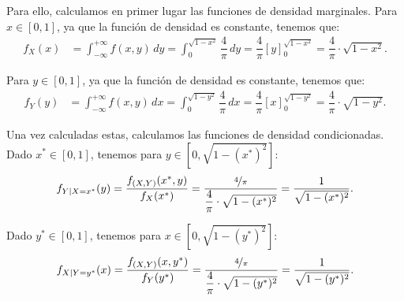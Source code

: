 \documentclass[12pt]{article}
\begin{document}
\begin{ejercicio}
\begin{enumerate}
            Para ello, calculamos en primer lugar las funciones de densidad marginales. Para $x\in [0,1]$, ya que la función de densidad es constante, tenemos que:
            \begin{align*}
                f_X(x) &= \int_{-\infty}^{+\infty} f(x, y) \, dy = \int_{0}^{\sqrt{1-x^2}} \dfrac{4}{\pi} \, dy = \dfrac{4}{\pi}\left[y\right]_{0}^{\sqrt{1-x^2}} = \dfrac{4}{\pi}\cdot \sqrt{1-x^2}.
            \end{align*}
    
            Para $y\in [0,1]$, ya que la función de densidad es constante, tenemos que:
            \begin{align*}
                f_Y(y) &= \int_{-\infty}^{+\infty} f(x, y) \, dx = \int_{0}^{\sqrt{1-y^2}} \dfrac{4}{\pi} \, dx = \dfrac{4}{\pi}\left[x\right]_{0}^{\sqrt{1-y^2}} = \dfrac{4}{\pi}\cdot \sqrt{1-y^2}.
            \end{align*}

            Una vez calculadas estas, calculamos las funciones de densidad condicionadas. Dado $x^\ast\in [0,1]$, tenemos para $y\in [0,\sqrt{1-(x^{\ast})^2}]$:
            \begin{equation*}
                f_{Y\mid X=x^\ast} (y) = \dfrac{f_{(X,Y)}(x^\ast, y)}{f_X(x^\ast)} = \dfrac{\nicefrac{4}{\pi}}{\dfrac{4}{\pi}\cdot \sqrt{1-(x^{\ast})^2}} = \dfrac{1}{\sqrt{1-(x^{\ast})^2}}.
            \end{equation*}
    
            Dado $y^\ast\in [0,1]$, tenemos para $x\in [0,\sqrt{1-(y^{\ast})^2}]$:
            \begin{equation*}
                f_{X\mid Y=y^\ast} (x) = \dfrac{f_{(X,Y)}(x, y^\ast)}{f_Y(y^\ast)} = \dfrac{\nicefrac{4}{\pi}}{\dfrac{4}{\pi}\cdot \sqrt{1-(y^{\ast})^2}} = \dfrac{1}{\sqrt{1-(y^{\ast})^2}}.
            \end{equation*}
        \end{enumerate}
    \end{ejercicio}
\end{document}
